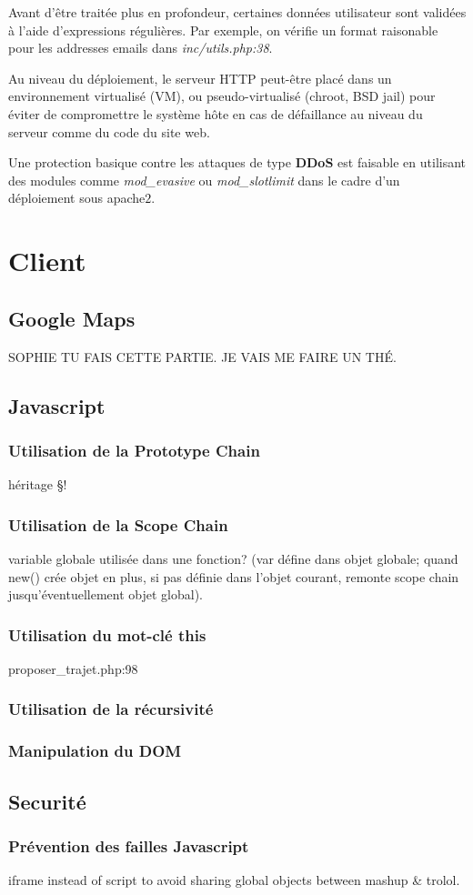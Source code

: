 \documentclass[a4paper]{article}
\begin{document}
Avant d'être traitée plus en profondeur, certaines données utilisateur
sont validées à l'aide d'expressions régulières. Par exemple, on vérifie
un format raisonable pour les addresses emails dans \textit{inc/utils.php:38}.

Au niveau du déploiement, le serveur HTTP peut-être placé dans un environnement
virtualisé (VM), ou pseudo-virtualisé (chroot, BSD jail) pour éviter de compromettre
le système hôte en cas de défaillance au niveau du serveur comme du code du site
web.

Une protection basique contre les attaques de type \textbf{DDoS} est faisable en
utilisant des modules comme \textit{mod\_evasive} ou \textit{mod\_slotlimit} dans
le cadre d'un déploiement sous apache$2$.

\section{Client}
\subsection{Google Maps}
SOPHIE TU FAIS CETTE PARTIE. JE VAIS ME FAIRE UN THÉ.
\subsection{Javascript}
\subsubsection{Utilisation de la Prototype Chain}
héritage §!
\subsubsection{Utilisation de la Scope Chain}
variable globale utilisée dans une fonction?
(var défine dans objet globale; quand new() crée
objet en plus, si pas définie dans l'objet courant,
remonte scope chain jusqu'éventuellement objet global).

\subsubsection{Utilisation du mot-clé this}
proposer\_trajet.php:98
\subsubsection{Utilisation de la récursivité}
\subsubsection{Manipulation du DOM}

\subsection{Securité} 
\subsubsection{Prévention des failles Javascript}
iframe instead of script to avoid sharing global objects
between mashup \& trolol.
\end{document}
